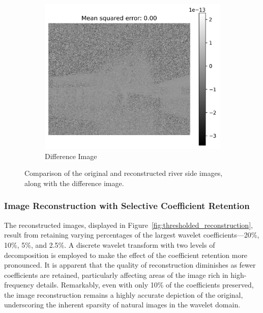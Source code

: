 \documentclass[11pt]{article}
\begin{document}
\begin{figure}[H]
    \begin{subfigure}{.45\textwidth}
        \centering
        \includegraphics[width=\linewidth]{figs/q2c_river_side_difference.jpeg}
        \caption{Difference Image}
        \label{fig:difference_image}
    \end{subfigure}%
    \caption{Comparison of the original and reconstructed river side images, along with the difference image.}
    \label{fig:full_reconstruction}
\end{figure}


\subsubsection{Image Reconstruction with Selective Coefficient Retention}
The reconstructed images, displayed in Figure~\ref{fig:thresholded_reconstruction}, result from retaining varying percentages of the largest wavelet coefficients---20\%, 10\%, 5\%, and 2.5\%. A discrete wavelet transform with two levels of decomposition is employed to make the effect of  the coefficient retention more pronounced. It is apparent that the quality of reconstruction diminishes as fewer coefficients are retained, particularly affecting areas of the image rich in high-frequency details. Remarkably, even with only 10\% of the coefficients preserved, the image reconstruction remains a highly accurate depiction of the original, underscoring the inherent sparsity of natural images in the wavelet domain.
\end{document}
